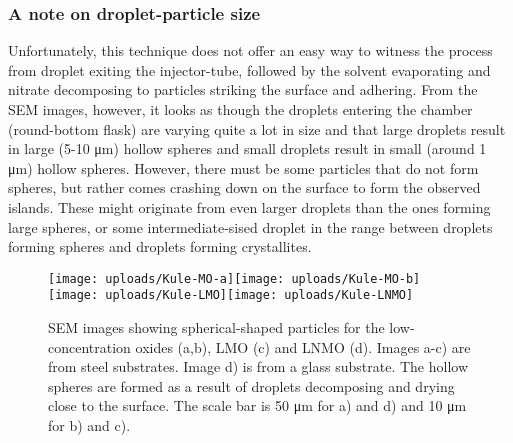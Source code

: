 \documentclass[Main/main.tex]{subfiles}
\begin{document}
\subsubsection{A note on droplet-particle size}
Unfortunately, this technique does not offer an easy way to witness the process from droplet exiting the injector-tube, followed by the solvent evaporating and nitrate decomposing to particles striking the surface and adhering. From the SEM images, however, it looks as though the droplets entering the chamber (round-bottom flask) are varying quite a lot in size and that large droplets result in large (5-10 \si{\micro m}) hollow spheres and small droplets result in small (around 1 \si{\micro m}) hollow spheres. However, there must be some particles that do not form spheres, but rather comes crashing down on the surface to form the observed islands. These might originate from even larger droplets than the ones forming large spheres, or some intermediate-sised droplet in the range between droplets forming spheres and droplets forming crystallites.

\begin{figure}[ht]
    \centering
	\texttt{[image: uploads/Kule-MO-a]}\texttt{[image: uploads/Kule-MO-b]} \\
	\texttt{[image: uploads/Kule-LMO]}\texttt{[image: uploads/Kule-LNMO]}
	\caption{SEM images showing spherical-shaped particles for the low-concentration oxides  (a,b), LMO (c) and LNMO (d). Images a-c) are from steel substrates. Image d) is from a glass substrate. The hollow spheres are formed as a result of droplets decomposing and drying close to the surface. The scale bar is 50 \si{\micro m} for a) and d) and 10 \si{\micro m} for b) and c).}
	\label{fig:Kule}
\end{figure}

\newpage
\end{document}
